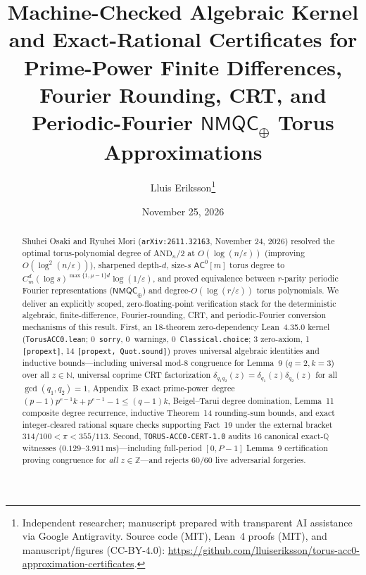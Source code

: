 \documentclass[10pt,twocolumn]{article}
\title{\vspace{-0.8em}\textbf{Machine-Checked Algebraic Kernel and Exact-Rational Certificates for Prime-Power Finite Differences, Fourier Rounding, CRT, and Periodic-Fourier $\mathsf{NMQC}_\oplus$ Torus Approximations}}
\author{Lluis Eriksson\thanks{Independent researcher; manuscript prepared with transparent AI assistance via Google Antigravity. Source code (MIT), Lean~4 proofs (MIT), and manuscript/figures (CC-BY-4.0): \url{https://github.com/lluiseriksson/torus-acc0-approximation-certificates}.}}
\date{November 25, 2026}
\newcommand{\ZZ}{\mathbb{Z}}
\newcommand{\QQ}{\mathbb{Q}}
\begin{document}
\maketitle
\vspace{-1.1em}

\begin{abstract}
Shuhei Osaki and Ryuhei Mori (\texttt{arXiv:2611.32163}, November 24, 2026) resolved the optimal torus-polynomial degree of $\mathrm{AND}_n/2$ at $O(\log(n/\varepsilon))$ (improving $O(\log^2(n/\varepsilon))$), sharpened depth-$d$, size-$s$ $\mathsf{AC}^0[m]$ torus degree to $C_m^d (\log s)^{\max\{1,\mu-1\}d}\log(1/\varepsilon)$, and proved equivalence between $r$-parity periodic Fourier representations ($\mathsf{NMQC}_\oplus$) and degree-$O(\log(r/\varepsilon))$ torus polynomials. We deliver an explicitly scoped, zero-floating-point verification stack for the deterministic algebraic, finite-difference, Fourier-rounding, CRT, and periodic-Fourier conversion mechanisms of this result. First, an 18-theorem zero-dependency Lean~4.35.0 kernel (\texttt{TorusACC0.lean}; 0~\texttt{sorry}, 0~warnings, 0~\texttt{Classical.choice}; 3 zero-axiom, 1 \texttt{[propext]}, 14 \texttt{[propext, Quot.sound]}) proves universal algebraic identities and inductive bounds—including universal mod-$8$ congruence for Lemma~9 ($q=2,k=3$) over all $z\in\mathbb{N}$, universal coprime CRT factorization $\delta_{q_1 q_2}(z)=\delta_{q_1}(z)\delta_{q_2}(z)$ for all $\gcd(q_1,q_2)=1$, Appendix~B exact prime-power degree $(p-1)p^{e-1}k+p^{e-1}-1\le (q-1)k$, Beigel--Tarui degree domination, Lemma~11 composite degree recurrence, inductive Theorem~14 rounding-sum bounds, and exact integer-cleared rational square checks supporting Fact~19 under the external bracket $314/100<\pi<355/113$. Second, \texttt{TORUS-ACC0-CERT-1.0} audits 16 canonical exact-$\QQ$ witnesses ($0.129$--$3.911\,\mathrm{ms}$)—including full-period $[0, P-1]$ Lemma~9 certification proving congruence for \emph{all} $z\in\ZZ$—and rejects 60/60 live adversarial forgeries.
\end{abstract}
\end{document}
